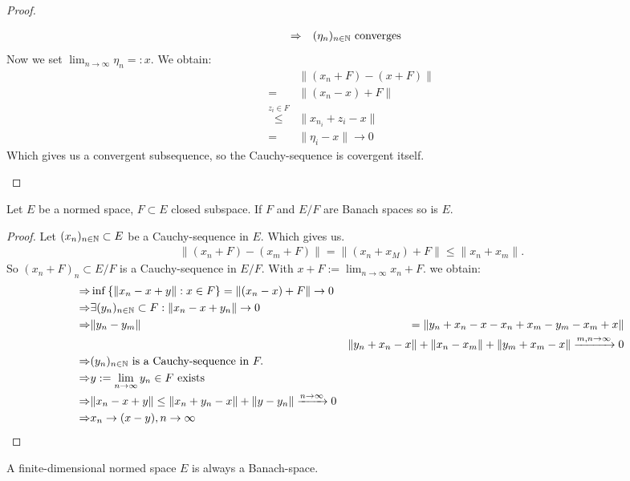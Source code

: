 \begin{proof}
\begin{enumerate}[(i)]
\begin{align*}
				\Rightarrow \quad	& (\eta_{n})_{n \in \mathbb{N}} \text{ converges}
			\end{align*}
			Now we set $\lim_{n \to \infty} \eta_n =: x$.
			We obtain:
			\begin{align*}
											&\|(x_n + F) - (x + F)\| \\
											=& \|(x_n - x) + F\| \\
				\stackrel{z_i \in F}{\le}	& \| x_{n_i} + z_i - x\|\\
											=& \| \eta_i - x\| \to 0
			\end{align*}
			Which gives us a convergent subsequence, so the Cauchy-sequence is covergent itself.
	\end{enumerate}
\end{proof}

\begin{lemma}\label{lem:banachspaceIfQuotientSpacesAre}
	Let $E$ be a normed space, $F \subset E$ closed subspace. If $F$ and $E/F$ are Banach spaces
	so is $E$.
\end{lemma}

\begin{proof}
	Let $(x_{n})_{n \in \mathbb{N}} \subset E$ be a Cauchy-sequence in $E$. Which gives us.
	\begin{align*}
		\|(x_n + F) - (x_m + F)\| = \|(x_n + x_M) + F \| \le \|x_n + x_m\|.
	\end{align*}
	So $(x_n + F)_n \subset E/F$ is a Cauchy-sequence in $E/F$. With $x+F := \lim_{n \to \infty} x_n + F$.
	we obtain:
	\begin{align*}
		\Rightarrow& \inf\left\{ \|x_n - x + y\| : x \in F \right\} = \|(x_n - x) + F\| \to 0\\
		\Rightarrow& \exists (y_{n})_{n \in \mathbb{N}} \subset F : \|x_n - x + y_n\| \to 0\\
		\Rightarrow& \|y_n - y_m\| &= \|y_n + x_n - x - x_n + x_m - y_m - x_m + x\|\\
		&&\|y_n + x_n - x\| + \|x_n - x_m\| + \|y_m + x_m - x\| \xrightarrow{m,n \to \infty} 0\\
		\Rightarrow& (y_{n})_{n \in \mathbb{N}} \text{ is a Cauchy-sequence in } F.\\
		\Rightarrow& y := \lim_{n \to \infty} y_n \in F \text{ exists}\\
		\Rightarrow& \|x_n - x + y\| \le \|x_n + y_n - x \| + \|y - y_n\| \xrightarrow{n \to \infty} 0\\
		\Rightarrow& x_n \to (x-y), n \to \infty
	\end{align*}
\end{proof}

\begin{kor}
	A finite-dimensional normed space $E$ is always a Banach-space.
\end{kor}

